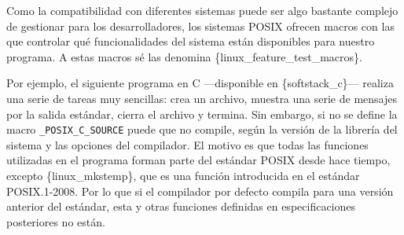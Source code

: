 Como la compatibilidad con diferentes sistemas puede ser algo bastante
complejo de gestionar para los desarrolladores, los sistemas POSIX
ofrecen macros con las que controlar qué funcionalidades del sistema
están disponibles para nuestro programa. A estas macros sé las denomina
\{linux\_feature\_test\_macros\}.

Por ejemplo, el siguiente programa en C ---disponible en
\{softstack\_c\}--- realiza una serie de tareas muy sencillas: crea un
archivo, muestra una serie de mensajes por la salida estándar, cierra el
archivo y termina. Sin embargo, si no se define la macro
\texttt{\_POSIX\_C\_SOURCE} puede que no compile, según la versión de la
librería del sistema y las opciones del compilador. El motivo es que
todas las funciones utilizadas en el programa forman parte del estándar
POSIX desde hace tiempo, excepto \{linux\_mkstemp\}, que es una función
introducida en el estándar POSIX.1-2008. Por lo que si el compilador por
defecto compila para una versión anterior del estándar, esta y otras
funciones definidas en especificaciones posteriores no están.

\begin{Shaded}
\begin{Highlighting}[]
\PreprocessorTok{                      }



\OperatorTok{()}
\OperatorTok{\{}
    \OperatorTok{[]} \OperatorTok{=} \OperatorTok{;}

\OperatorTok{(}\OperatorTok{);}                               

\OperatorTok{(}\OperatorTok{);}
    \OperatorTok{=}\OperatorTok{(}\OperatorTok{,}\OperatorTok{|}\OperatorTok{);}
\OperatorTok{(}\OperatorTok{);}
\OperatorTok{(}\OperatorTok{);}

    \OperatorTok{;}
\OperatorTok{\}}
\end{Highlighting}
\end{Shaded}


